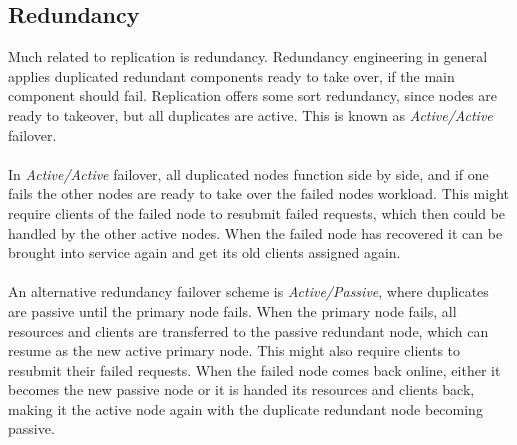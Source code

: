 \subsection{Redundancy}
Much related to replication is redundancy. Redundancy engineering in general
applies duplicated redundant components ready to take over, if the main
component should fail. Replication offers some sort redundancy, since nodes are
ready to takeover, but all duplicates are active. This is known as
\textit{Active/Active} failover.
\\\\
In \textit{Active/Active} failover, all duplicated nodes function side by side,
and if one fails the other nodes are ready to take over the failed nodes
workload. This might require clients of the failed node to resubmit failed
requests, which then could be handled by the other active nodes. When the failed
node has recovered it can be brought into service again and get its old clients
assigned again.
\\\\
An alternative redundancy failover scheme is \textit{Active/Passive}, where
duplicates are passive until the primary node fails. When the primary node
fails, all resources and clients are transferred to the passive redundant node,
which can resume as the new active primary node. This might also require clients
to resubmit their failed requests. When the failed node comes back online,
either it becomes the new passive node or it is handed its resources and clients
back, making it the active node again with the duplicate redundant node becoming
passive.
